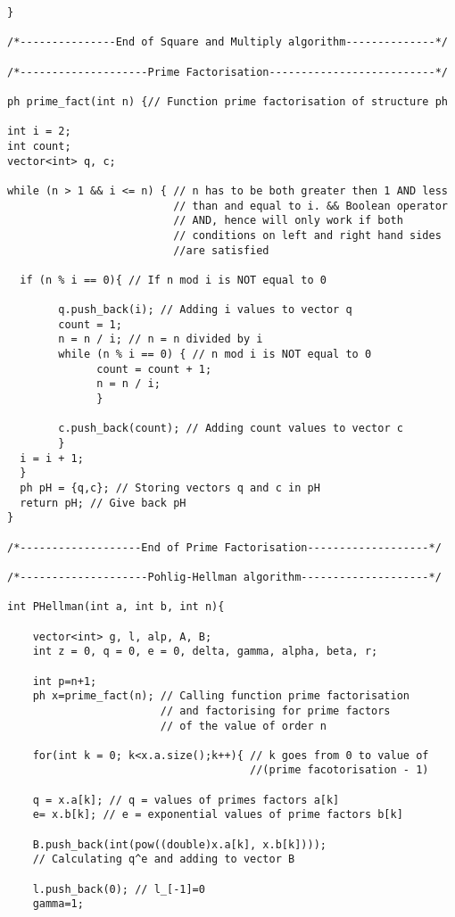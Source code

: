 \documentclass[iwp,first]{luthesis}
\begin{document}
\begin{verbatim}
}

/*---------------End of Square and Multiply algorithm--------------*/

/*--------------------Prime Factorisation--------------------------*/

ph prime_fact(int n) {// Function prime factorisation of structure ph

int i = 2;
int count;
vector<int> q, c;
 
while (n > 1 && i <= n) { // n has to be both greater then 1 AND less 
                          // than and equal to i. && Boolean operator 
                          // AND, hence will only work if both 
                          // conditions on left and right hand sides 
                          //are satisfied
  
  if (n % i == 0){ // If n mod i is NOT equal to 0
        
        q.push_back(i); // Adding i values to vector q
        count = 1;
        n = n / i; // n = n divided by i
        while (n % i == 0) { // n mod i is NOT equal to 0
              count = count + 1;
              n = n / i;
              }
        
        c.push_back(count); // Adding count values to vector c
        }
  i = i + 1;
  }
  ph pH = {q,c}; // Storing vectors q and c in pH
  return pH; // Give back pH
}

/*-------------------End of Prime Factorisation-------------------*/

/*--------------------Pohlig-Hellman algorithm--------------------*/

int PHellman(int a, int b, int n){
    
    vector<int> g, l, alp, A, B;
    int z = 0, q = 0, e = 0, delta, gamma, alpha, beta, r;

    int p=n+1;
    ph x=prime_fact(n); // Calling function prime factorisation 
                        // and factorising for prime factors 
                        // of the value of order n
   
    for(int k = 0; k<x.a.size();k++){ // k goes from 0 to value of 
                                      //(prime facotorisation - 1)
    
    q = x.a[k]; // q = values of primes factors a[k]
    e= x.b[k]; // e = exponential values of prime factors b[k]
    
    B.push_back(int(pow((double)x.a[k], x.b[k]))); 
    // Calculating q^e and adding to vector B
    
    l.push_back(0); // l_[-1]=0
    gamma=1;
   

\end{verbatim}
\end{document}
